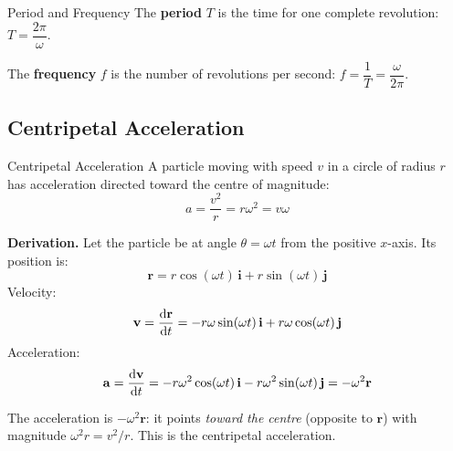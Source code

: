 \documentclass[12pt, a4paper]{book}
\newcommand{\ii}{\mathbf{i}}
\newcommand{\jj}{\mathbf{j}}
\newcommand{\rvec}{\mathbf{r}}
\newcommand{\vvec}{\mathbf{v}}
\newcommand{\avec}{\mathbf{a}}
\begin{document}
\begin{defn}{Period and Frequency}{}
The \textbf{period} $T$ is the time for one complete revolution: $T = \dfrac{2\pi}{\omega}$.

The \textbf{frequency} $f$ is the number of revolutions per second: $f = \dfrac{1}{T} = \dfrac{\omega}{2\pi}$.
\end{defn}

\subsection{Centripetal Acceleration}

\begin{thm}{Centripetal Acceleration}{}
A particle moving with speed $v$ in a circle of radius $r$ has acceleration directed toward the centre of magnitude:
\[
  a = \frac{v^2}{r} = r\omega^2 = v\omega
\]
\end{thm}

\textbf{Derivation.} Let the particle be at angle $\theta = \omega t$ from the positive $x$-axis. Its position is:
\[
  \rvec = r\cos(\omega t)\,\ii + r\sin(\omega t)\,\jj
\]
Velocity:
\[
  \vvec = \dv{\rvec}{t} = -r\omega\sin(\omega t)\,\ii + r\omega\cos(\omega t)\,\jj
\]
Acceleration:
\[
  \avec = \dv{\vvec}{t} = -r\omega^2\cos(\omega t)\,\ii - r\omega^2\sin(\omega t)\,\jj = -\omega^2\rvec
\]

The acceleration is $-\omega^2\rvec$: it points \emph{toward the centre} (opposite to $\rvec$) with magnitude $\omega^2 r = v^2/r$. This is the centripetal acceleration.

\begin{center}
\end{center}
\end{document}
